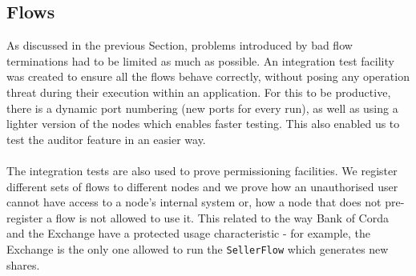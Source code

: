 \documentclass[12pt,twoside]{article}
\begin{document}
\subsection{Flows}
\label{sub:Flows}
As discussed in the previous Section, problems introduced by bad flow terminations had to be limited as much as possible. An integration test facility was created to ensure all the flows behave correctly, without posing any operation threat during their execution within an application. For this to be productive, there is a dynamic port numbering (new ports for every run), as well as using a lighter version of the nodes which enables faster testing. This also enabled us to test the auditor feature in an easier way.
\\ \\
The integration tests are also used to prove permissioning facilities. We register different sets of flows to different nodes and we prove how an unauthorised user cannot have access to a node's internal system or, how a node that does not pre-register a flow is not allowed to use it. This related to the way Bank of Corda and the Exchange have a protected usage characteristic - for example, the Exchange is the only one allowed to run the \verb|SellerFlow| which generates new shares.
\end{document}
